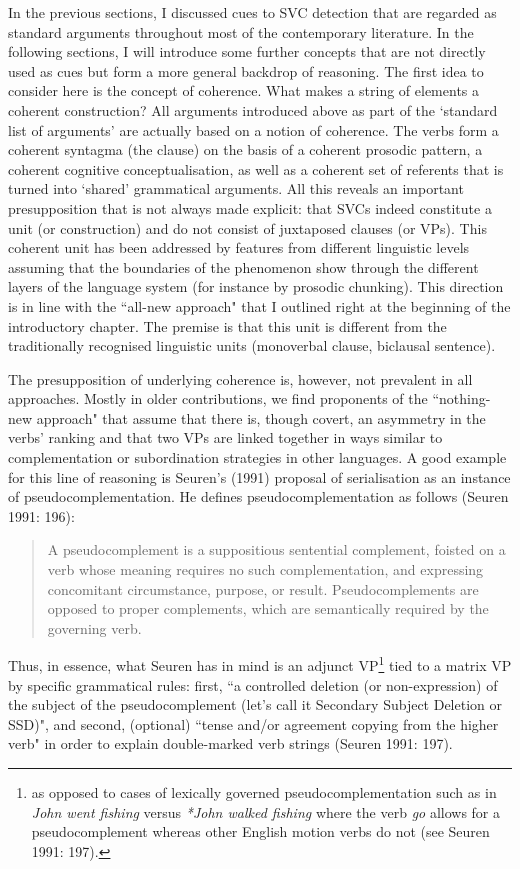 In the previous sections, I discussed cues to SVC detection that are regarded as standard arguments throughout most of the contemporary literature. In the following sections, I will introduce some further concepts that are not directly used as cues but form a more general backdrop of reasoning. The first idea to consider here is the concept of coherence. What makes a string of elements a coherent construction? All arguments introduced above as part of the `standard list of arguments' are actually based on a notion of coherence. The verbs form a coherent syntagma (the clause) on the basis of a coherent prosodic pattern, a coherent cognitive conceptualisation, as well as a coherent set of referents that is turned into `shared' grammatical arguments. All this reveals an important presupposition that is not always made explicit: that SVCs indeed constitute a unit (or construction) and do not consist of juxtaposed clauses (or VPs). This coherent unit has been addressed by features from different linguistic levels assuming that the boundaries of the phenomenon show through the different layers of the language system (for instance by prosodic chunking). This direction is in line with the ``all-new approach" that I outlined right at the beginning of the introductory chapter. The premise is that this unit is different from the traditionally recognised linguistic units (monoverbal clause, biclausal sentence). 

The presupposition of underlying coherence is, however, not prevalent in all approaches. Mostly in older contributions, we find proponents of the ``nothing-new approach" that assume that there is, though covert, an asymmetry in the verbs' ranking and that two VPs are linked together in ways similar to complementation or subordination strategies in other languages. A good example for this line of reasoning is Seuren's (1991) proposal of serialisation as an instance of pseudocomplementation. He defines pseudocomplementation as follows (Seuren 1991: 196): 

\begin{quote} A pseudocomplement is a suppositious sentential complement, foisted on a verb whose meaning requires no such complementation, and expressing concomitant circumstance, purpose, or result. Pseudocomplements are opposed to proper complements, which are semantically required by the governing verb.
\end{quote}

Thus, in essence, what Seuren has in mind is an adjunct VP\footnote{as opposed to cases of lexically governed pseudocomplementation such as in \textit{John went fishing} versus \textit{*John walked fishing} where the verb \textit{go} allows for a pseudocomplement whereas other English motion verbs do not (see Seuren 1991: 197).} tied to a matrix VP by specific grammatical rules: first, ``a controlled deletion (or non-expression) of the subject of the pseudocomplement (let's call it Secondary Subject Deletion or SSD)", and second, (optional) ``tense and/or agreement copying from the higher verb" in order to explain double-marked verb strings (Seuren 1991: 197).

